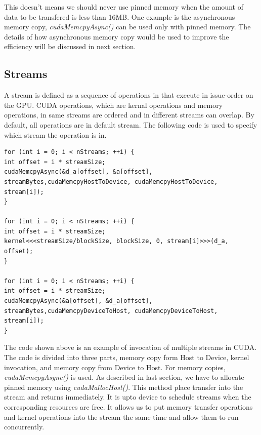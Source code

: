 \documentclass[journal,12pt,onecolumn,draftclsnofoot]{ieeeconf}  %
\begin{document}
This doesn't means we should never use pinned memory when the amount of data to be transfered is less than 16MB. One example is the asynchronous memory copy, \textit{cudaMemcpyAsync()} can be used only with pinned memory. The details of how asynchronous memory copy would be used to improve the efficiency will be discussed in next section.

\subsection{Streams}
A stream is defined as a sequence of operations in that execute in issue-order on the GPU. CUDA operations, which are kernal operations and memory operations, in same streams are ordered and in different streams can overlap. By default, all operations are in default stream. The following code is used to specify which stream the operation is in. \par
\begin{lstlisting}
for (int i = 0; i < nStreams; ++i) {
int offset = i * streamSize;
cudaMemcpyAsync(&d_a[offset], &a[offset], streamBytes,cudaMemcpyHostToDevice, cudaMemcpyHostToDevice, stream[i]);
}

for (int i = 0; i < nStreams; ++i) {
int offset = i * streamSize;
kernel<<<streamSize/blockSize, blockSize, 0, stream[i]>>>(d_a, offset);
}

for (int i = 0; i < nStreams; ++i) {
int offset = i * streamSize;
cudaMemcpyAsync(&a[offset], &d_a[offset], streamBytes,cudaMemcpyDeviceToHost, cudaMemcpyDeviceToHost, stream[i]);
}

\end{lstlisting}
The code shown above is an example of invocation of multiple streams in CUDA. The code is divided into three parts, memory copy form Host to Device, kernel invocation, and memory copy from Device to Host. For memory copies, \textit{cudaMemcpyAsync()} is used. As described in last section, we have to allocate pinned memory using \textit{cudaMallocHost()}. This method place transfer into the stream and returns immediately. It is upto device to schedule streams when the corresponding resources are free. It allows us to put memory transfer operations and kernel operations into the stream the same time and allow them to run concurrently.\cite{Stream} \par
\end{document}
